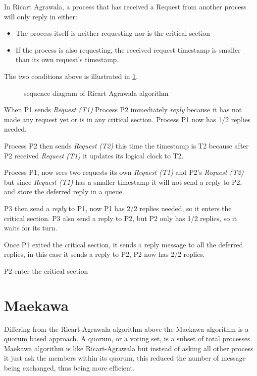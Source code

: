 In Ricart Agrawala, a process that has received a Request from another process will only 
reply in either:

\begin{itemize}
  \item The process itself is neither requesting nor is the critical section
  \item If the process is also requesting, the received request timestamp is smaller than its own request's timestamp.
\end{itemize}

The two conditions above is illustrated in \ref{fig:ricart_agrawala_seq}.

\begin{figure}[htbp]
  \centering
  
  \caption{sequence diagram of Ricart Agrawala algorithm}
  \label{fig:ricart_agrawala_seq}
\end{figure}

When P1 sends \textit{Request (T1)} Process P2 immediately \textit{reply} because it has not made any request yet 
or is in any critical section. Process P1 now has 1/2 replies needed.

Process P2 then sends \textit{Request (T2)} this time the timestamp is T2 because after P2 received 
\textit{Request (T1)} it updates its logical clock to T2. 

Process P1, now sees two requests its own \textit{Request (T1)} and P2's \textit{Request (T2)}
but since \textit{Request (T1)} has a smaller timestamp it will not send a reply to P2, and store
the deferred reply in a queue.

P3 then send a \textit{reply} to P1, now P1 has 2/2 replies needed, so it enters the critical 
section. P3 also send a reply to P2, but P2 only has 1/2 replies, so it waits for its turn.

Once P1 exited the critical section, it sends a reply message to all the deferred replies,
in this case it sends a reply to P2, P2 now has 2/2 replies. 

P2 enter the critical section

\section{Maekawa}
Differing from the Ricart-Agrawala algorithm above the Maekawa algorithm is a quorum based 
approach. A quorum, or a voting set, is a subset of total processes. Maekawa algorithm
is like Ricart-Agrawala but instead of asking all other process it just ask the members within
its quorum, this reduced the number of message being exchanged, thus being more efficient.

